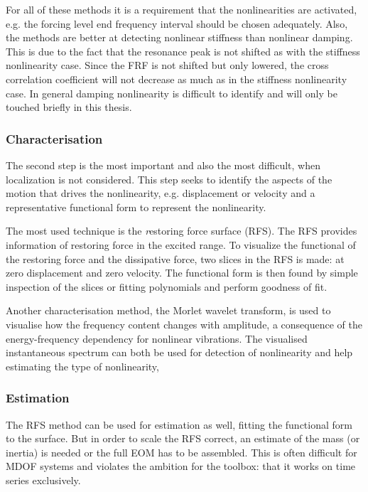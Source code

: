 For all of these methods it is a requirement that the nonlinearities are
activated, e.g. the forcing level end frequency interval should be chosen
adequately. Also, the methods are better at detecting nonlinear stiffness than
nonlinear damping. This is due to the fact that the resonance peak is not
shifted as with the stiffness nonlinearity case. Since the FRF is not shifted
but only lowered, the cross correlation coefficient will not decrease as much as
in the stiffness nonlinearity case. In general damping nonlinearity is difficult
to identify and will only be touched briefly in this thesis.

\subsubsection{Characterisation}
\label{sec:characterization}

The second step is the most important and also the most difficult, when
localization is not considered.
This step seeks to identify the aspects of the motion that drives the
nonlinearity, e.g. displacement or velocity and a representative functional form
to represent the nonlinearity.


The most used technique is the {\textit restoring force surface} (RFS). The RFS
provides information of restoring force in the excited range. To visualize the
functional of the restoring force and the dissipative force, two slices in the
RFS is made: at zero displacement and zero velocity. The functional form is then
found by simple inspection of the slices or fitting polynomials and perform
goodness of fit.

Another characterisation method, the Morlet wavelet transform, is used to
visualise how the frequency content changes with amplitude, a consequence of the
energy-frequency dependency for nonlinear vibrations. The visualised
instantaneous spectrum can both be used for detection of nonlinearity and help
estimating the type of nonlinearity,



\subsubsection{Estimation}
\label{sec:estimation}

The RFS method can be used for estimation as well, fitting the functional form
to the surface. But in order to scale the RFS correct, an estimate of the mass
(or inertia) is needed or the full EOM has to be assembled. This is often
difficult for MDOF systems and violates the ambition for the toolbox: that it
works on time series exclusively.

